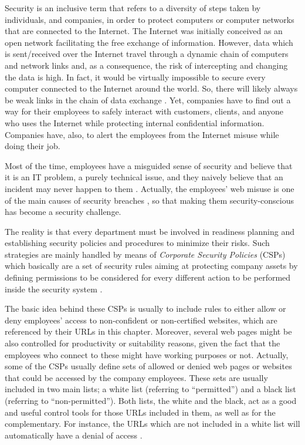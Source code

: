 \documentclass{llncs}
\begin{document}
\noindent Security is an inclusive term that refers to a diversity of steps taken by individuals,
and companies, in order to protect computers or computer networks that are connected to the Internet.
The Internet was initially conceived as an open network facilitating the free exchange of information.
However, data which is sent/received over the Internet travel through a dynamic chain of computers and
network links and, as a consequence, the risk of intercepting and changing the data is high.
In fact, it would be virtually impossible to secure every computer connected to the Internet around the world.
So, there will likely always be weak links in the chain of data exchange \cite{cheswick2003firewalls}.
Yet, companies have to find out a way for their employees to safely interact with customers, clients, and anyone
who uses the Internet while protecting internal confidential information. Companies have, also, to alert the employees
from the Internet misuse while doing their job.

Most of the time, employees have a misguided sense of security and believe that it is an IT problem, a purely technical
issue, and they naively believe that an incident may never happen to them \cite{stanton2005analysis}.
Actually, the employees' web misuse is one of the main causes of  security breaches \cite{breivik2002abstract},
so that making them security-conscious has become a security  challenge.

The reality is that every department must be involved in  readiness planning and establishing security policies
and procedures  to minimize their risks. Such strategies are mainly handled by
means  of \textit{Corporate Security Policies} (CSPs) which basically are a  set of security rules aiming at
protecting company assets by defining  permissions to be considered for every different action to be  performed
inside the security system \cite{kaeo2003designing}.

The basic idea behind these CSPs is usually to include rules to either allow or deny employees' access to
non-confident or non-certified websites, which are referenced by their URLs in this chapter. Moreover, several web pages
might be also controlled for productivity  or suitability reasons, given the fact that the employees who connect
to these might have working purposes or not. Actually, some of the  CSPs usually define sets of allowed or denied
web pages or websites that could be accessed by the company employees. These sets are  usually included in two main
lists; a white list (referring to  ``permitted'') and a black list (referring to  ``non-permitted'').
Both lists, the white and the black, act as a  good and useful control tools for those URLs included in them,
as  well as for the complementary. For instance, the URLs which are not included in a white list will automatically
have a denial of  access \cite{ludl2007effectiveness}.
\end{document}
